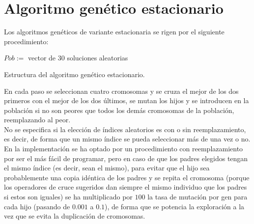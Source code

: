 \documentclass{article}
\newenvironment{algo}{
	\vspace*{0.5cm}
	\begin{algorithm}[H]}{
	\end{algorithm}
	\vspace*{0.5cm}
}
\begin{document}
\section{Algoritmo genético estacionario}

Los algoritmos genéticos de variante estacionaria se rigen por el siguiente procedimiento:

\begin{algo}
	
	$Pob :=$ vector de $30$ soluciones aleatorias\;
	
	
	\vspace{0.2cm}
	\caption{Estructura del algoritmo genético estacionario.}
\end{algo}

En cada paso se seleccionan cuatro cromosomas y se cruza el mejor de los dos primeros con el mejor de los dos últimos, se mutan los hijos y se introducen en la población si no son peores que todos los demás cromosomas de la población, reemplazando al peor. \\

No se especifica si la elección de índices aleatorios es con o sin reemplazamiento, es decir, de forma que un mismo índice se pueda seleccionar más de una vez o no. En la implementación se ha optado por un procedimiento con reemplazamiento por ser el más fácil de programar, pero en caso de que los padres elegidos tengan el mismo índice (es decir, sean el mismo), para evitar que el hijo sea probablemente una copia idéntica de los padres y se repita el cromosoma (porque los operadores de cruce sugeridos dan siempre el mismo individuo que los padres si estos son iguales) se ha multiplicado por $100$ la tasa de mutación por gen para cada hijo (pasando de $0.001$ a $0.1$), de forma que se potencia la exploración a la vez que se evita la duplicación de cromosomas. \\
\end{document}
